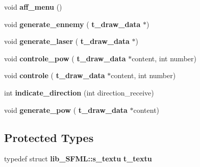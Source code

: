 \begin{DoxyCompactItemize}
\item 
\mbox{\label{classlib___s_f_m_l_a8fc700af68afc8f1c41a7d118126ad4a}} 
void {\bfseries aff\+\_\+menu} ()
\item 
\mbox{\label{classlib___s_f_m_l_abc745ea0beb2c35824f4c346f402e0c0}} 
void {\bfseries generate\+\_\+ennemy} (\textbf{ t\+\_\+draw\+\_\+data} $\ast$)
\item 
\mbox{\label{classlib___s_f_m_l_a52b0e4a47cb5dcbc9b846653636b5bde}} 
void {\bfseries generate\+\_\+laser} (\textbf{ t\+\_\+draw\+\_\+data} $\ast$)
\item 
\mbox{\label{classlib___s_f_m_l_a40ad910246ade260212ac705e275fb0b}} 
void {\bfseries controle\+\_\+pow} (\textbf{ t\+\_\+draw\+\_\+data} $\ast$content, int number)
\item 
\mbox{\label{classlib___s_f_m_l_a80d61a769246ccbe4f5ce4b94e8e4c15}} 
void {\bfseries controle} (\textbf{ t\+\_\+draw\+\_\+data} $\ast$content, int number)
\item 
\mbox{\label{classlib___s_f_m_l_a068f012264062a1d44c9855831138c0c}} 
int {\bfseries indicate\+\_\+direction} (int direction\+\_\+receive)
\item 
\mbox{\label{classlib___s_f_m_l_a3f50450c16f23ec265e25257e1076a14}} 
void {\bfseries generate\+\_\+pow} (\textbf{ t\+\_\+draw\+\_\+data} $\ast$content)
\end{DoxyCompactItemize}
\subsection*{Protected Types}
\begin{DoxyCompactItemize}
\item 
\mbox{\label{classlib___s_f_m_l_a01308ab6d94978b9f3266126ce7f0e9c}} 
typedef struct \textbf{ lib\+\_\+\+S\+F\+M\+L\+::s\+\_\+textu} {\bfseries t\+\_\+textu}
\end{DoxyCompactItemize}
